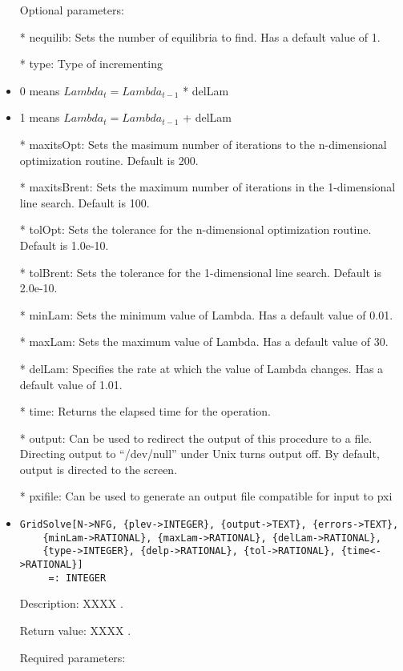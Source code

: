 \begin{itemize}
\item
[Optional parameters:]\hfil\null

\bd
\item
[* nequilib:] Sets the number of equilibria to find.  Has a default 
value of 1.  
\item
[* type:]  Type of incrementing 
	
\bd
\item
0 means $Lambda_t = Lambda_{t-1}$ * delLam
\item 
1 means $Lambda_t = Lambda_{t-1}$ + delLam
\ed

\item
[* maxitsOpt:] Sets the masimum number of iterations to the 
n-dimensional optimization routine.  Default is 200.
\item
[* maxitsBrent:] Sets the maximum number of iterations in
the 1-dimensional line search.  Default is 100.
\item
[* tolOpt:] Sets the tolerance for the n-dimensional
optimization routine.  Default is 1.0e-10.
\item
[* tolBrent:] Sets the tolerance for the 1-dimensional line
search.  Default is 2.0e-10.
\item
[* minLam:] Sets the minimum value of Lambda.  Has a default value of 0.01.
\item
[* maxLam:] Sets the maximum value of Lambda.  Has a default value of 30.
\item
[* delLam:] Specifies the rate at which the value of Lambda changes. Has a default value of 1.01.
\item
[* time:] Returns the elapsed time for the operation.
\item
[* output:] Can be used to redirect the output of this procedure to a
file.  Directing output to ``/dev/null'' under Unix turns output off.
By default, output is directed to the screen.
\item
[* pxifile:]Can be used to generate an output file
compatible for input to pxi
\ed
\ed

\item
\begin{verbatim}
GridSolve[N->NFG, {plev->INTEGER}, {output->TEXT}, {errors->TEXT},
	{minLam->RATIONAL}, {maxLam->RATIONAL}, {delLam->RATIONAL}, 
	{type->INTEGER}, {delp->RATIONAL}, {tol->RATIONAL}, {time<->RATIONAL}]
	 =: INTEGER
\end{verbatim}

\bd
\item
[Description:] XXXX .
\item
[Return value:] XXXX .
\item
[Required parameters:]\hfil\null
	

\end{itemize}
